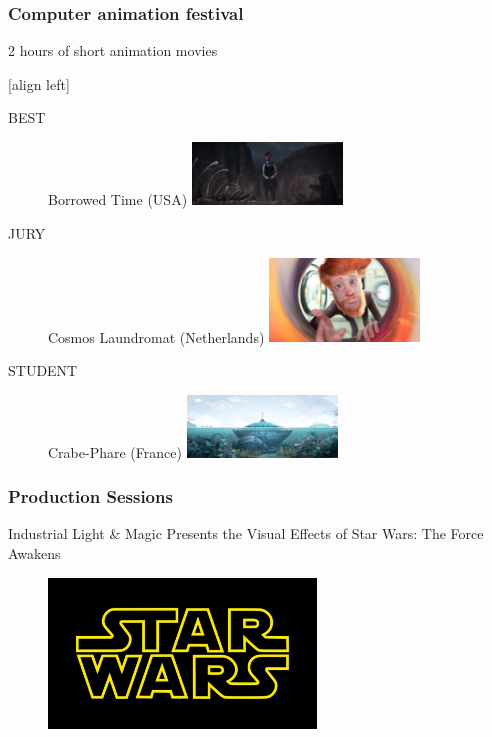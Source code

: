\frame
{
	\frametitle{Computer animation festival}
	
	2 hours of short animation movies
	
	[align left]
	\begin{description}
		\item[BEST] Borrowed Time (USA) 
		\hfill { \includegraphics[width=4cm]{img/caf1.jpg}}
		\item[JURY] Cosmos Laundromat (Netherlands)
		\hfill {\includegraphics[width=4cm]{img/caf2.jpg}}
		\item[STUDENT] Crabe-Phare (France)
		\hfill {\includegraphics[width=4cm]{img/caf3.jpeg}}
	\end{description}
}

\frame
{
	\frametitle{Production Sessions}
	Industrial Light \& Magic Presents the Visual Effects of Star Wars: The Force Awakens
	\begin{figure}
		\centering
		\includegraphics[height=4cm]{img/starwars.jpg}
	\end{figure}
}
